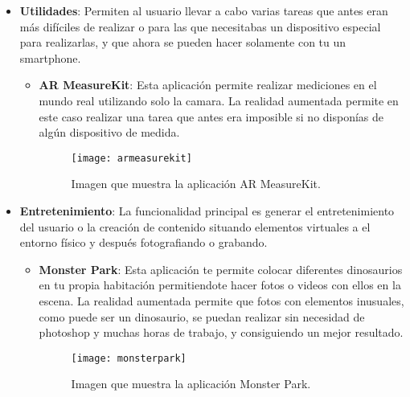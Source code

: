 \begin{itemize}
\begin{itemize}
  \end{itemize}

  \item \textbf{Utilidades}: Permiten al usuario llevar a cabo varias tareas que antes eran más difíciles de realizar o para las que necesitabas un dispositivo especial para realizarlas, y que ahora se pueden hacer solamente con tu un smartphone.

  \begin{itemize}
    \item \textbf{AR MeasureKit}: Esta aplicación permite realizar mediciones en el mundo real utilizando solo la camara. La realidad aumentada permite en este caso realizar una tarea que antes era imposible si no disponías de algún dispositivo de medida.

    \begin{figure}[h]
      \centering
      \texttt{[image: armeasurekit]}
      \caption{Imagen que muestra la aplicación AR MeasureKit.\protect\footnotemark}
      \label{figura-ar-measurekit}
    \end{figure}

  \end{itemize}

  \item \textbf{Entretenimiento}: La funcionalidad principal es generar el entretenimiento del usuario o la creación de contenido situando elementos virtuales a el entorno físico y después fotografiando o grabando.

  \begin{itemize}
    \item \textbf{Monster Park}: Esta aplicación te permite colocar diferentes dinosaurios en tu propia habitación permitiendote hacer fotos o videos con ellos en la escena. La realidad aumentada permite que fotos con elementos inusuales, como puede ser un dinosaurio, se puedan realizar sin necesidad de photoshop y muchas horas de trabajo, y consiguiendo un mejor resultado.

    \begin{figure}[h]
      \centering
      \texttt{[image: monsterpark]}
      \caption{Imagen que muestra la aplicación Monster Park.\protect\footnotemark}
      \label{figura-monster-park}
    \end{figure}


\end{itemize}
\end{itemize}
